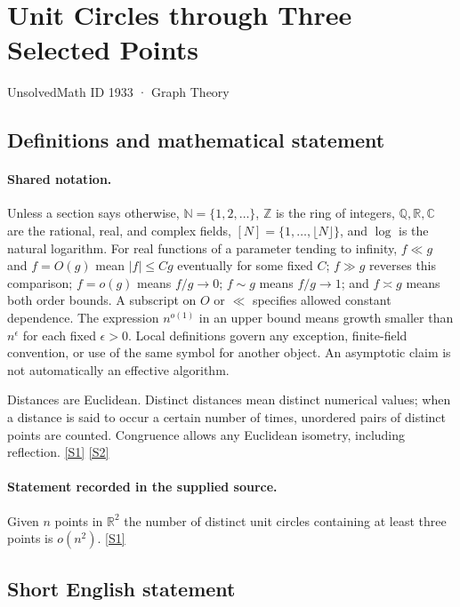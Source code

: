 \documentclass[11pt,a4paper]{article}
\newcommand{\N}{\mathbb{N}}
\newcommand{\Z}{\mathbb{Z}}
\newcommand{\Q}{\mathbb{Q}}
\newcommand{\R}{\mathbb{R}}
\newcommand{\C}{\mathbb{C}}
\newcommand{\sref}[2]{\hyperlink{source:#1:#2}{[S#2]}}
\begin{document}

\setcounter{section}{1932}

\section{Unit Circles through Three Selected Points}\label{1933}

{\small\sffamily UnsolvedMath ID 1933 · Graph Theory}

\subsection{Definitions and mathematical statement}

\paragraph{Shared notation.}Unless a section says otherwise, $\N=\{1,2,\ldots\}$,
$\Z$ is the ring of integers, $\Q,\R,\C$ are the rational, real, and complex
fields, $[N]=\{1,\ldots,\lfloor N\rfloor\}$, and $\log$ is the natural
logarithm. For real functions of a parameter tending to infinity,
$f\ll g$ and $f=O(g)$ mean $|f|\leq Cg$ eventually for some fixed $C$;
$f\gg g$ reverses this comparison; $f=o(g)$ means $f/g\to0$;
$f\sim g$ means $f/g\to1$; and $f\asymp g$ means both order bounds.
A subscript on $O$ or $\ll$ specifies allowed constant dependence.
The expression $n^{o(1)}$ in an upper bound means growth smaller than
$n^\epsilon$ for each fixed $\epsilon>0$. Local definitions govern any
exception, finite-field convention, or use of the same symbol for another
object. An asymptotic claim is not automatically an effective algorithm.



Distances are Euclidean. Distinct distances mean distinct numerical values; when a distance is said to occur a certain number of times, unordered pairs of distinct points are counted. Congruence allows any Euclidean isometry, including reflection. \sref{1933}{1} \sref{1933}{2}

\paragraph{Statement recorded in the supplied source.}
Given $n$ points in $\mathbb{R}^2$ the number of distinct unit circles containing at least three points is $o(n^2)$. \sref{1933}{1}

\subsection{Short English statement}
\end{document}
